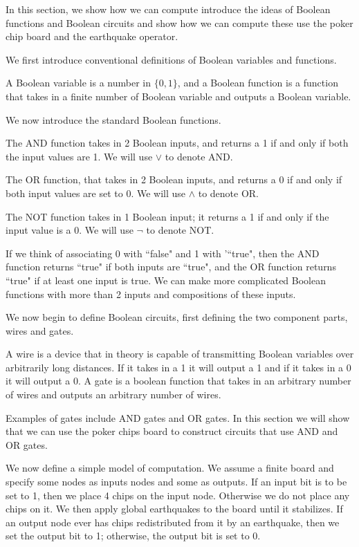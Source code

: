 \documentclass[runningheads,a4paper]{llncs}
\begin{document}
In this section, we show how we can compute introduce the ideas of Boolean functions and Boolean circuits and show how we can compute these use the poker chip board and the earthquake operator.

We first introduce conventional definitions of Boolean variables and functions.
\begin{definition} 
A Boolean variable is a number in $\{0,1\}$, and a Boolean function is a function that takes in a finite number of Boolean variable and outputs a Boolean variable.
\end{definition}

We now introduce the standard Boolean functions. 
\begin{definition}
 The AND function takes in 2 Boolean inputs, and returns a 1 if and only if both the input values are 1. We will use $\vee$ to denote AND.
\end{definition}
\begin{definition}
The OR function, that takes in 2 Boolean inputs, and returns a 0 if and only if both input values are set to 0. We will use $\wedge$ to denote OR.
\end{definition}
\begin{definition}
The NOT function takes in 1 Boolean input; it returns a 1 if and only if the input value is a 0. We will use $\neg$ to denote NOT.
 \end{definition}
 If we think of associating 0 with ``false" and 1 with '``true", then the AND function returns ``true" if both inputs are ``true", and the OR function returns ``true" if at least one input is true. We can make more complicated Boolean functions with more than 2 inputs and compositions of these inputs. 
 
 We now begin to define Boolean circuits, first defining the two component parts, wires and gates.
\begin{definition}
 A wire is a device that in theory is capable of transmitting Boolean variables over arbitrarily long distances. If it takes in a 1 it will output a 1 and if it takes in a 0 it will output a 0. A gate is a boolean function that takes in an arbitrary number of wires and outputs an arbitrary number of wires.
\end{definition}
Examples of gates include AND gates and OR gates. In this section we will show that we can use the poker chips board to construct circuits that use AND and OR gates.

We now define a simple model of computation. We assume a finite board and specify some nodes as inputs nodes and some as outputs. If an input bit is to be set to 1, then we place 4 chips on the input node. Otherwise we do not place any chips on it. We then apply global earthquakes to the board until it stabilizes. If an output node ever has chips redistributed from it by an earthquake, then we set the output bit to 1; otherwise, the output bit is set to 0. 
\end{document}
